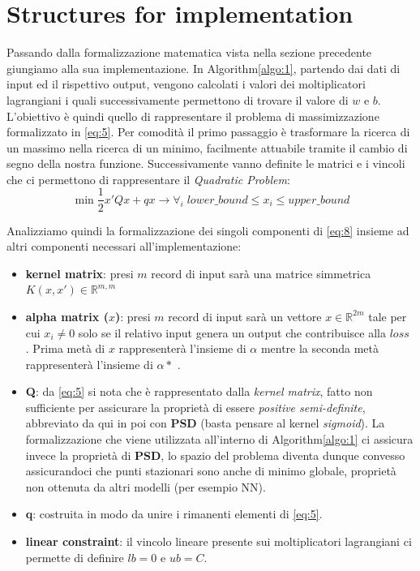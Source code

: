 \documentclass[12pt]{article}
\begin{document}
	\pagebreak
	\section{Structures for implementation}
	Passando dalla formalizzazione matematica vista nella sezione precedente giungiamo alla sua implementazione. In Algorithm\ref{algo:1}, partendo dai dati di input ed il rispettivo output, vengono calcolati i valori dei moltiplicatori lagrangiani i quali successivamente permettono di trovare il valore di $w$ e $b$.
L’obiettivo è quindi quello di rappresentare il problema di massimizzazione formalizzato in \eqref{eq:5}. Per comodità il primo passaggio è trasformare la ricerca di un massimo nella ricerca di un minimo, facilmente attuabile tramite il cambio di segno della nostra funzione. Successivamente vanno definite le matrici e i vincoli che ci permettono di rappresentare il \textit{Quadratic Problem}:\\
	\begin{equation}\label{eq:8}
		\min \frac{1}{2}x'Qx + qx \longrightarrow \forall_i\; lower\_bound\leq x_i\leq upper\_bound
	\end{equation}

	Analizziamo quindi la formalizzazione dei singoli componenti di \eqref{eq:8} insieme ad altri componenti necessari all'implementazione:
	
	\begin{itemize}
		\item \textbf{kernel matrix}: presi $m$ record di input sarà una matrice simmetrica $ K(x,x') \in \mathbb{R}^{m,m}$
		\item \textbf{alpha matrix ($x$)}: presi $m$ record di input sarà un vettore $ x \in \mathbb{R}^{2m} $ tale per cui $x_i \neq 0$ solo se il relativo input genera un output che contribuisce alla $loss$ . Prima metà di $x$ rappresenterà l'insieme di $\alpha$ mentre la seconda metà rappresenterà l'insieme di $\alpha*$ .
		\item \textbf{Q}: da \eqref{eq:5} si nota che è rappresentato dalla \textit{kernel matrix}, fatto non sufficiente per assicurare la proprietà di essere \textit{positive semi-definite}, abbreviato da qui in poi con \textbf{PSD} (basta pensare al kernel \textit{sigmoid}). La formalizzazione che viene utilizzata all’interno di Algorithm\ref{algo:1} \linebreak{[ \ref{bib:1} ]} ci assicura invece la proprietà di \textbf{PSD},  lo spazio del problema diventa dunque convesso assicurandoci che punti stazionari sono anche di minimo globale, proprietà non ottenuta da altri modelli (per esempio NN). 
		\item \textbf{q}: costruita in modo da unire i rimanenti elementi di \eqref{eq:5}.
		\item \textbf{linear constraint}: il vincolo lineare presente sui moltiplicatori lagrangiani ci permette di definire $lb=0$ e $ub=C$.
	\end{itemize}
		
\end{document}
